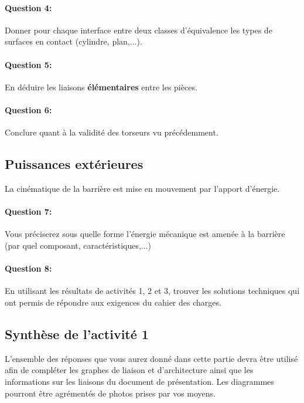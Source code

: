 \paragraph{Question 4:} Donner pour chaque interface entre deux classes d'équivalence les types de surfaces en contact (cylindre, plan,...).

\reponse[3]

\paragraph{Question 5:} En déduire les liaisons \textbf{élémentaires} entre les pièces.

\reponse[3]

\paragraph{Question 6:} Conclure quant à la validité des torseurs vu précédemment.

\reponse[3]

\subsection{Puissances extérieures}

La cinématique de la barrière est mise en mouvement par l'apport d'énergie.

\paragraph{Question 7:} Vous préciserez sous quelle forme l'énergie mécanique est amenée à la barrière (par quel composant, caractéristiques,...)

\reponse[3]

\paragraph{Question 8:} En utilisant les résultats de activités 1, 2 et 3, trouver les solutions techniques qui ont permis de répondre aux exigences du cahier des charges.

\subsection{Synthèse de l'activité 1}

L'ensemble des réponses que vous aurez donné dans cette partie devra être utilisé afin de compléter les graphes de liaison et d'architecture ainsi que les informations sur les liaisons du document de présentation. Les diagrammes pourront être agrémentés de photos prises par vos moyens.

